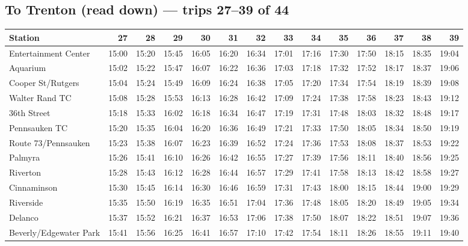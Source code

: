 \subsection*{To Trenton (read down) --- trips 27--39 of 44}
\begin{center}\footnotesize\setlength{\tabcolsep}{3pt}\begin{tabular}{@{}lrrrrrrrrrrrrr@{}}\toprule
Station & 27 & 28 & 29 & 30 & 31 & 32 & 33 & 34 & 35 & 36 & 37 & 38 & 39 \\\midrule
Entertainment Center & 15:00 & 15:20 & 15:45 & 16:05 & 16:20 & 16:34 & 17:01 & 17:16 & 17:30 & 17:50 & 18:15 & 18:35 & 19:04 \\
Aquarium & 15:02 & 15:22 & 15:47 & 16:07 & 16:22 & 16:36 & 17:03 & 17:18 & 17:32 & 17:52 & 18:17 & 18:37 & 19:06 \\
Cooper St/Rutgers & 15:04 & 15:24 & 15:49 & 16:09 & 16:24 & 16:38 & 17:05 & 17:20 & 17:34 & 17:54 & 18:19 & 18:39 & 19:08 \\
Walter Rand TC & 15:08 & 15:28 & 15:53 & 16:13 & 16:28 & 16:42 & 17:09 & 17:24 & 17:38 & 17:58 & 18:23 & 18:43 & 19:12 \\
36th Street & 15:18 & 15:33 & 16:02 & 16:18 & 16:34 & 16:47 & 17:19 & 17:31 & 17:48 & 18:03 & 18:32 & 18:48 & 19:17 \\
Pennsauken TC & 15:20 & 15:35 & 16:04 & 16:20 & 16:36 & 16:49 & 17:21 & 17:33 & 17:50 & 18:05 & 18:34 & 18:50 & 19:19 \\
Route 73/Pennsauken & 15:23 & 15:38 & 16:07 & 16:23 & 16:39 & 16:52 & 17:24 & 17:36 & 17:53 & 18:08 & 18:37 & 18:53 & 19:22 \\
Palmyra & 15:26 & 15:41 & 16:10 & 16:26 & 16:42 & 16:55 & 17:27 & 17:39 & 17:56 & 18:11 & 18:40 & 18:56 & 19:25 \\
Riverton & 15:28 & 15:43 & 16:12 & 16:28 & 16:44 & 16:57 & 17:29 & 17:41 & 17:58 & 18:13 & 18:42 & 18:58 & 19:27 \\
Cinnaminson & 15:30 & 15:45 & 16:14 & 16:30 & 16:46 & 16:59 & 17:31 & 17:43 & 18:00 & 18:15 & 18:44 & 19:00 & 19:29 \\
Riverside & 15:35 & 15:50 & 16:19 & 16:35 & 16:51 & 17:04 & 17:36 & 17:48 & 18:05 & 18:20 & 18:49 & 19:05 & 19:34 \\
Delanco & 15:37 & 15:52 & 16:21 & 16:37 & 16:53 & 17:06 & 17:38 & 17:50 & 18:07 & 18:22 & 18:51 & 19:07 & 19:36 \\
Beverly/Edgewater Park & 15:41 & 15:56 & 16:25 & 16:41 & 16:57 & 17:10 & 17:42 & 17:54 & 18:11 & 18:26 & 18:55 & 19:11 & 19:40 \\

\end{tabular}
\end{center}

